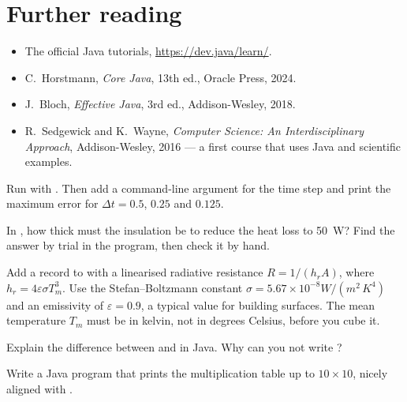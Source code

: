 \section{Further reading}
\begin{itemize}
\item The official Java tutorials, \url{https://dev.java/learn/}.
\item C.~Horstmann, \emph{Core Java}, 13th ed., Oracle Press, 2024.
\item J.~Bloch, \emph{Effective Java}, 3rd ed., Addison-Wesley, 2018.
\item R.~Sedgewick and K.~Wayne, \emph{Computer Science: An Interdisciplinary Approach},
  Addison-Wesley, 2016 --- a first course that uses Java and scientific examples.
\end{itemize}

\begin{exercises}
\item Run  with . Then add a command-line argument for
  the time step and print the maximum error for $\Delta t = 0.5$, $0.25$ and $0.125$.
\item In , how thick must the insulation be to reduce the heat loss to
  50~W? Find the answer by trial in the program, then check it by hand.
\item Add a  record to  with a linearised radiative
  resistance $R = 1/(h_r A)$, where $h_r = 4\varepsilon\sigma T_m^3$. Use the
  Stefan--Boltzmann constant $\sigma = 5.67\times10^{-8}\unit{W/(m^2\,K^4)}$ and an
  emissivity of $\varepsilon = 0.9$, a typical value for building surfaces. The mean
  temperature $T_m$ must be in kelvin, not in degrees Celsius, before you cube it.
\enlargethispage{3\baselineskip}
\item Explain the difference between  and  in Java. Why can you
  not write ?
\item Write a Java program that prints the multiplication table up to $10\times10$, nicely
  aligned with .
\end{exercises}
